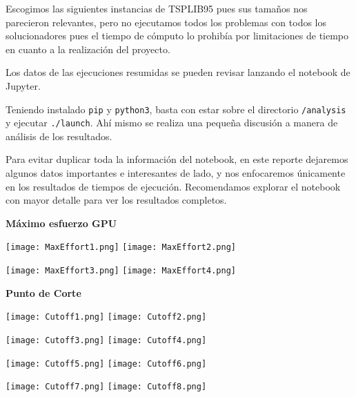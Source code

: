 \documentclass[main.tex]{subfiles}
\begin{document}
Escogimos las siguientes instancias de TSPLIB95 pues sus tamaños nos parecieron
relevantes, pero no ejecutamos todos los problemas con todos los solucionadores
pues el tiempo de cómputo lo prohibía por limitaciones de tiempo en cuanto a la
realización del proyecto.

Los datos de las ejecuciones resumidas se pueden revisar lanzando el notebook
de Jupyter.

Teniendo instalado \texttt{pip} y \texttt{python3}, basta con estar sobre el
directorio \mbox{\texttt{/analysis}} y ejecutar \mbox{\texttt{./launch}}. Ahí
mismo se realiza una pequeña discusión a manera de análisis de los resultados.

Para evitar duplicar toda la información del notebook, en este reporte
dejaremos algunos datos importantes e interesantes de lado, y nos enfocaremos
únicamente en los resultados de tiempos de ejecución. Recomendamos explorar el
notebook con mayor detalle para ver los resultados completos.

\begin{cajaEnunciado}
    \textbf{Máximo esfuerzo GPU}
\end{cajaEnunciado}

\begin{center}\texttt{[image: MaxEffort1.png]} \texttt{[image: MaxEffort2.png]}\end{center}

\begin{center}\texttt{[image: MaxEffort3.png]} \texttt{[image: MaxEffort4.png]}\end{center}

\begin{cajaEnunciado}
    \textbf{Punto de Corte}
\end{cajaEnunciado}

\begin{center}\texttt{[image: Cutoff1.png]} \texttt{[image: Cutoff2.png]}\end{center}

\begin{center}\texttt{[image: Cutoff3.png]} \texttt{[image: Cutoff4.png]}\end{center}

\begin{center}\texttt{[image: Cutoff5.png]} \texttt{[image: Cutoff6.png]}\end{center}

\begin{center}\texttt{[image: Cutoff7.png]} \texttt{[image: Cutoff8.png]}\end{center}
\end{document}

